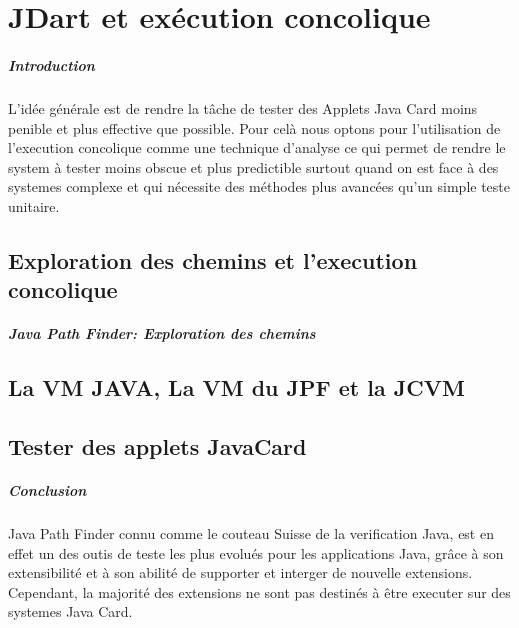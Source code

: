 \chapter{JDart et exécution concolique}
  \paragraph{Introduction}
    L'idée générale est de rendre la tâche de tester des Applets Java Card moins penible et plus effective que possible.
    Pour celà nous optons pour l'utilisation de l'execution concolique comme une technique d'analyse ce qui permet de rendre 
    le system à tester moins obscue et plus predictible surtout quand on est face à des systemes complexe
    et qui nécessite des méthodes plus avancées qu'un simple teste unitaire.
  \section{Exploration des chemins et l'execution concolique}
    \paragraph{Java Path Finder: Exploration des chemins}
  \section{La VM JAVA, La VM du JPF et la JCVM}
  \section{Tester des applets JavaCard}
  \paragraph{Conclusion}
  Java Path Finder connu comme le couteau Suisse de la verification Java,
  est en effet un des outis de teste les plus evolués pour les applications Java,
  grâce à son extensibilité et à son abilité de supporter et interger de nouvelle extensions.
  Cependant, la majorité des extensions ne sont pas destinés à être executer sur des systemes Java Card.
  